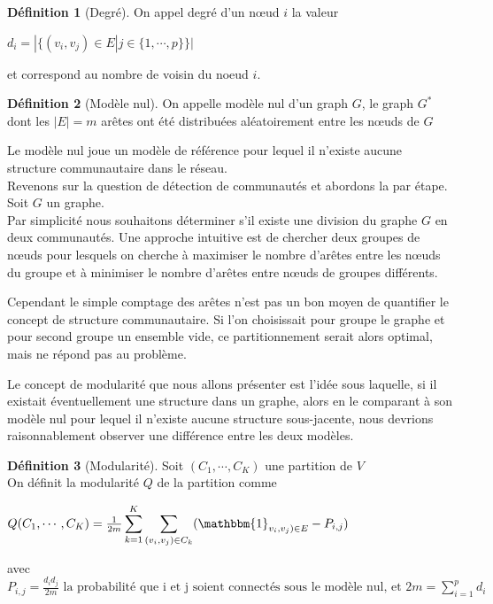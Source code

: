 \documentclass[frenchb]{report}
\newcommand{\1}{\mathbbm{1}}
\theoremstyle{definition}\newtheorem{defn}{Définition}
\theoremstyle{definition}\newtheorem{exm}{Exemple}
\theoremstyle{definition}\newtheorem{nota}{Notation}
\theoremstyle{definition}\newtheorem{rem}{Remarque}
\begin{document}
\begin{defn}[Degré]
On appel degré d'un nœud $i$ la valeur 
\begin{center}
$d_i = |\{(v_i,v_j) \in E | j \in {\{1,\cdots,p\}} \}| $
\end{center}
\end{defn}
et correspond au nombre de voisin du noeud $i$.\\

\begin{defn}[Modèle nul]
On appelle modèle nul d'un graph $G$, le graph $G^*$ dont les $|E| = m$ arêtes ont été distribuées aléatoirement entre les nœuds de $G$
\end{defn}
Le modèle nul joue un modèle de référence pour lequel il n'existe aucune structure communautaire dans le réseau.\\

Revenons sur la question de détection de communautés et abordons la par étape.\\
Soit $G$ un graphe.\\
Par simplicité nous souhaitons déterminer s'il existe une division du graphe $G$ en deux communautés. Une approche intuitive est de chercher deux groupes de nœuds pour lesquels on cherche à maximiser le nombre d'arêtes entre les nœuds du groupe et à minimiser le nombre d'arêtes entre nœuds de groupes différents. 

Cependant le simple comptage des arêtes n'est pas un bon moyen de quantifier le concept de structure communautaire. Si l'on choisissait pour groupe le graphe et pour second groupe un ensemble vide, ce partitionnement serait alors optimal, mais ne répond pas au problème.

Le concept de modularité que nous allons présenter est l'idée sous laquelle, si il existait éventuellement une structure dans un graphe, alors en le comparant à son modèle nul pour lequel il n'existe aucune structure sous-jacente, nous devrions raisonnablement observer une différence entre les deux modèles.\\

\begin{defn}[Modularité]
Soit $(C_1,\cdots,C_K)$ une partition de $V$\\
On définit la modularité $Q$ de la partition comme 
\begin{center}
$Q(C_1,\cdots,C_K) = \frac{1}{2m}\displaystyle\sum_{k=1}^K \displaystyle\sum_{(v_i,v_j)\in C_k} (\1_{v_i,v_j) \in E} - P_{i,j})$
\end{center}
avec $P_{i,j} = \frac{d_i d_j}{2m} \text{ la probabilité que i et j soient connectés sous le modèle nul, et } 2m = \displaystyle\sum_{i=1}^p d_i$
\end{defn}
\end{document}
